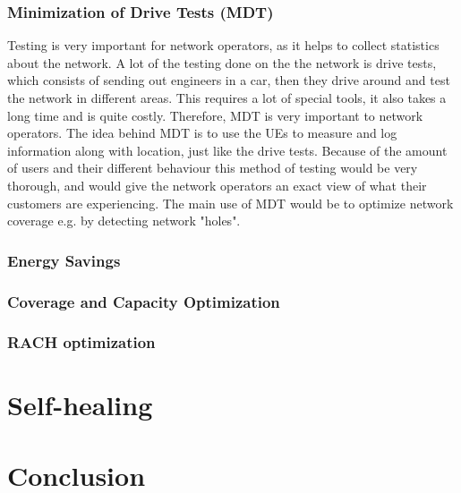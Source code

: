 \documentclass{report}
\begin{document}
\subsection{Minimization of Drive Tests (MDT)}
Testing is very important for network operators, as it helps to collect statistics about the network. A lot of the testing done on the the network is drive tests, which consists of sending out engineers in a car, then they drive around and test the network in different areas. This requires a lot of special tools, it also takes a long time and is quite costly. Therefore, MDT is very important to network operators. The idea behind MDT is to use the UEs to measure and log information along with location, just like the drive tests. Because of the amount of users and their different behaviour this method of testing would be very thorough, and would give the network operators an exact view of what their customers are experiencing. The main use of MDT would be to optimize network coverage e.g. by detecting network "holes". 

\subsection{Energy Savings}

\subsection{Coverage and Capacity Optimization}

\subsection{RACH optimization}
\chapter{Self-healing}


\chapter{Conclusion}




\clearpage
{}


\nocite{Hamalainen2009} %
\nocite{Jamalipour2008} %
\nocite{Kakadia2017} %
\nocite{Sartori2012} %
\end{document}
